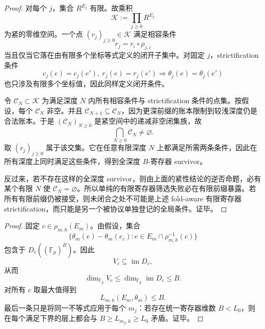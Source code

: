 \begin{proof}
对每个 \(j\)，集合 \(R^{E_j}\) 有限。故乘积
\[
\mathcal K:=\prod_{j\ge0}R^{E_j}
\]
为紧的零维空间。一个点 \((r_j)_{j\ge0}\in\mathcal K\) 满足相容条件
\[
r_j=r_i\circ\rho_{j,i}
\]
当且仅当它落在由有限多个坐标等式定义的闭开子集中。对固定 \(j\)，strictification 条件
\[
c_j(e)=c_j(e'),\ r_j(e)=r_j(e')\Longrightarrow \theta_j(e)=\theta_j(e')
\]
也只涉及有限多个坐标值，因此同样定义闭开条件。

令 \(\mathcal C_N\subset\mathcal K\) 为满足深度 \(N\) 内所有相容条件与 strictification 条件的点集。按假设，每个 \(\mathcal C_N\) 非空。并且 \(\mathcal C_{N+1}\subseteq\mathcal C_N\)，因为更深前缀的账本限制到较浅深度仍是合法账本。于是 \((\mathcal C_N)_{N\ge0}\) 是紧空间中的递减非空闭集族，故
\[
\bigcap_{N\ge0}\mathcal C_N\ne\varnothing.
\]
取 \((r_j)_{j\ge0}\) 属于该交集。它在任意有限深度 \(N\) 上都满足所需两条条件，因此在所有深度上同时满足这些条件，得到全深度 \(B\)-寄存器 survivor。

反过来，若不存在这样的全深度 survivor，则由上面的紧性结论的逆否命题，必有某个有限 \(N\) 使 \(\mathcal C_N=\varnothing\)。所以单纯的有限寄存器筛选失败必在有限前缀暴露。若所有有限前缀仍被接受，则未闭合之处不可能是上述 fold-aware 有限寄存器 strictification，而只能是另一个被协议单独登记的全局条件。证毕。
\end{proof}

\begin{proof}
固定 \(c\in\rho_{m,h}(E_m)\)。由假设，集合
\[
\{\theta_m(e)-\theta_m(e_c):e\in E_m\cap\rho_{m,h}^{-1}(c)\}
\]
包含于 \(D_c((\mathbb F_p)^B)\)。因此
\[
V_c\subseteq \operatorname{im}D_c,
\]
从而
\[
\dim_{\mathbb F_p}V_c\le \dim_{\mathbb F_p}\operatorname{im}D_c\le B.
\]
对所有 \(c\) 取最大值得到
\[
L_{m,h}(E_m,\theta_m)\le B.
\]
最后一条只是将同一不等式应用于每个 \(m_j\)：若存在统一寄存器维数 \(B<L_0\)，则在每个满足下界的层上都会与 \(B\ge L_{m_j,h}\ge L_0\) 矛盾。证毕。
\end{proof}


